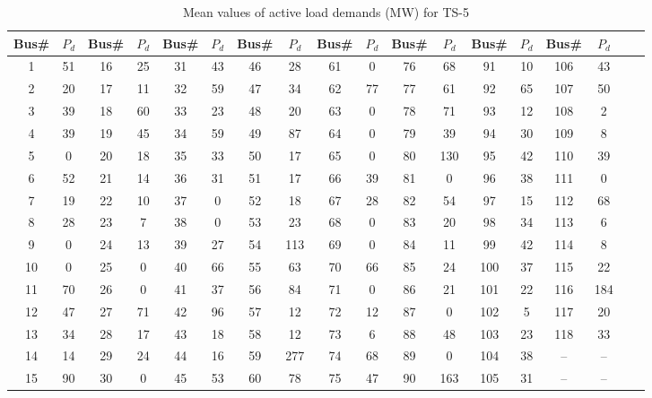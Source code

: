 \begin{table} [tb]
\caption{Mean values of active load demands (MW) for TS-5}
\label{table_Pd118}
  \centering
  \scalebox{0.8} {
  \begin{tabular}{|c|c|c|c|c|c|c|c|c|c|c|c|c|c|c|c|c|c|}
    \hline
    Bus\# & $P_d$ & Bus\# & $P_d$  & Bus\# & $P_d$  & Bus\# & $P_d$  & Bus\# & $P_d$ & Bus\# & $P_d$ & Bus\# & $P_d$ & Bus\# & $P_d$ \\ 
    \hline
    1	&	51	&	16	&	25	&	31	&	43	&	46	&	28	&	61	&	0	&	76	&	68	&	91	&	10	&	106	&	43\\ 
    \hline
2	&	20	&	17	&	11	&	32	&	59	&	47	&	34	&	62	&	77	&	77	&	61	&	92	&	65	&	107	&	50\\ 
    \hline
3	&	39	&	18	&	60	&	33	&	23	&	48	&	20	&	63	&	0	&	78	&	71	&	93	&	12	&	108	&	2\\ 
    \hline
4	&	39	&	19	&	45	&	34	&	59	&	49	&	87	&	64	&	0	&	79	&	39	&	94	&	30	&	109	&	8\\ 
    \hline
5	&	0	&	20	&	18	&	35	&	33	&	50	&	17	&	65	&	0	&	80	&	130	&	95	&	42	&	110	&	39\\ 
    \hline
6	&	52	&	21	&	14	&	36	&	31	&	51	&	17	&	66	&	39	&	81	&	0	&	96	&	38	&	111	&	0\\ 
    \hline
7	&	19	&	22	&	10	&	37	&	0	&	52	&	18	&	67	&	28	&	82	&	54	&	97	&	15	&	112	&	68\\ 
    \hline
8	&	28	&	23	&	7	&	38	&	0	&	53	&	23	&	68	&	0	&	83	&	20	&	98	&	34	&	113	&	6\\ 
    \hline
9	&	0	&	24	&	13	&	39	&	27	&	54	&	113	&	69	&	0	&	84	&	11	&	99	&	42	&	114	&	8\\ 
    \hline
10	&	0	&	25	&	0	&	40	&	66	&	55	&	63	&	70	&	66	&	85	&	24	&	100	&	37	&	115	&	22\\ 
    \hline
11	&	70	&	26	&	0	&	41	&	37	&	56	&	84	&	71	&	0	&	86	&	21	&	101	&	22	&	116	&	184\\ 
    \hline
12	&	47	&	27	&	71	&	42	&	96	&	57	&	12	&	72	&	12	&	87	&	0	&	102	&	5	&	117	&	20\\ 
    \hline
13	&	34	&	28	&	17	&	43	&	18	&	58	&	12	&	73	&	6	&	88	&	48	&	103	&	23	&	118	&	33\\ 
    \hline
14	&	14	&	29	&	24	&	44	&	16	&	59	&	277	&	74	&	68	&	89	&	0	&	104	&	38	&	--	& --	\\ 
    \hline
15	&	90	&	30	&	0	&	45	&	53	&	60	&	78	&	75	&	47	&	90	&	163	&	105	&	31	&	--	& -- \\ 
    \hline
  \end{tabular}  
  }
\end{table} 

